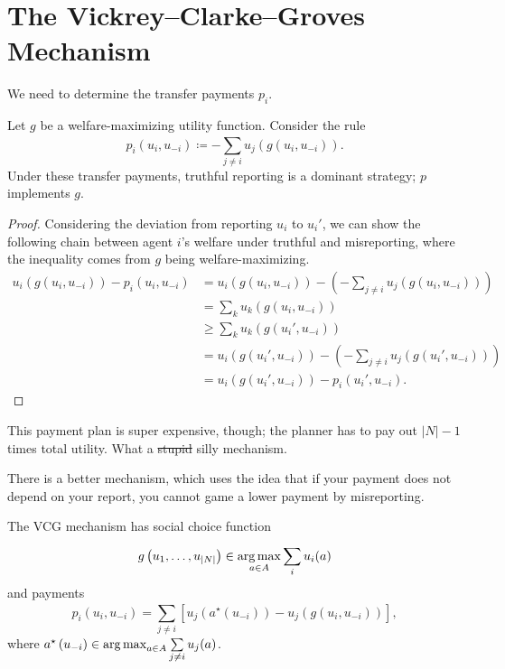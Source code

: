 \section{The Vickrey--Clarke--Groves Mechanism}

We need to determine the transfer payments $p_i$. 

\begin{proposition}
	Let $g$ be a welfare-maximizing utility function.
	Consider the rule \[
		p_i\left( u_i,u_{-i} \right) \coloneqq -\sum\limits_{j\ne i}^{} u_j\left( g\left( u_i,u_{-i} \right) \right)
	.\] Under these transfer payments, truthful reporting is a dominant strategy; $p$ implements $g$.
\end{proposition}

\begin{proof}
	Considering the deviation from reporting $u_i$ to $u_i'$, we can show the following chain between agent $i$'s welfare under truthful and misreporting, where the inequality comes from $g$ being welfare-maximizing.
	\begin{align*}
		u_i(g\left( u_i,u_{-i} \right)) - p_i\left( u_i,u_{-i} \right)
		&= u_i\left( g\left( u_i,u_{-i} \right) \right) - \left( - \sum\limits_{j\ne i}^{} u_j \left( g\left( u_i,u_{-i} \right) \right) \right) \\
		&= \sum_k u_k\left( g\left( u_i,u_{-i} \right) \right) \\
		&\ge \sum_k u_k \left( g\left( u_i',u_{-i} \right) \right) \\
		&= u_i\left( g\left( u_i', u_{-i} \right) \right) - \left( - \sum\limits_{j \ne i}^{} u_j \left( g\left( u_i', u_{-i} \right) \right) \right) \\
		&= u_i \left( g\left( u_i', u_{-i} \right) \right) - p_i \left( u_i', u_{-i} \right)
	.\end{align*}
\end{proof}

This payment plan is super expensive, though; the planner has to pay out $\left| N \right|-1$ times total utility. What a \st{stupid} silly mechanism.

There is a better mechanism, which uses the idea that if your payment does not depend on your report, you cannot game a lower payment by misreporting.
\begin{definition}
	The VCG mechanism has social choice function \[
		g\left( u_1,\ldots,u_{\left| N \right|} \right) \in \operatorname*{arg\,max}_{a \in A} \sum\limits_{i}^{} u_i(a)
	\] and payments \[
		p_i\left( u_i,u_{-i} \right) = \sum\limits_{j\ne i}^{} \left[ u_j\left( a^\star\left( u_{-i} \right) \right) - u_j\left(g\left(u_i,u_{-i} \right)\right)\right]
	,\] 
	where $a^\star\left( u_{-i} \right) \in \operatorname*{arg\,max}_{a \in A} \sum\limits_{j \ne i}^{} u_j(a)$.
\end{definition}

